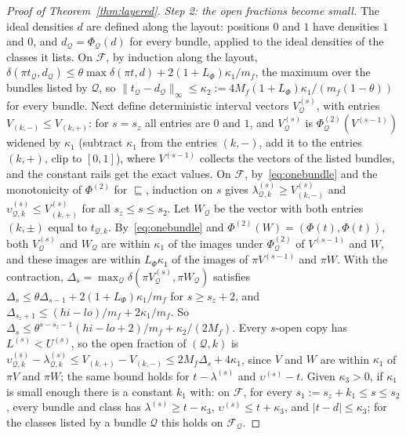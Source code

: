 \documentclass[11pt]{amsart}
\theoremstyle{definition}
\theoremstyle{remark}
\begin{document}
\begin{proof}[Proof of Theorem~\ref{thm:layered}]
\emph{Step 2: the open fractions become small.} The ideal densities $d$ are defined along the
layout: positions $0$ and $1$ have densities $1$ and $0$, and $d_{\mathcal Q}=\Phi_{\mathcal Q}(d)$
for every bundle, applied to the ideal densities of the classes it lists. On $\mathcal F$, by
induction along the layout, $\delta(\pi t_{\mathcal Q},d_{\mathcal Q})\le\theta\max\delta(\pi t,d)+2(1+L_\Phi)\kappa_1/m_f$,
the maximum over the bundles listed by $\mathcal Q$, so
$\|t_{\mathcal Q}-d_{\mathcal Q}\|_\infty\le\kappa_2:=4M_f(1+L_\Phi)\kappa_1/(m_f(1-\theta))$ for every
bundle. Next define deterministic interval vectors $V^{(s)}_{\mathcal Q}$, with entries
$V_{(k,-)}\le V_{(k,+)}$: for $s=s_z$ all entries are $0$ and $1$, and
$V^{(s)}_{\mathcal Q}$ is $\Phi^{(2)}_{\mathcal Q}(V^{(s-1)})$ widened by $\kappa_1$ (subtract $\kappa_1$
from the entries $(k,-)$, add it to the entries $(k,+)$, clip to $[0,1]$), where
$V^{(s-1)}$ collects the vectors of the listed bundles, and the constant rails get the exact
values. On $\mathcal F$, by~\eqref{eq:onebundle} and the monotonicity of $\Phi^{(2)}$ for
$\sqsubseteq$, induction on $s$ gives
$\lambda^{(s)}_{\mathcal Q,k}\ge V^{(s)}_{(k,-)}$ and $\upsilon^{(s)}_{\mathcal Q,k}\le V^{(s)}_{(k,+)}$
for all $s_z\le s\le s_2$. Let $W_{\mathcal Q}$ be the vector with both entries $(k,\pm)$ equal to
$t_{\mathcal Q,k}$. By~\eqref{eq:onebundle} and $\Phi^{(2)}(W)=(\Phi(t),\Phi(t))$, both
$V^{(s)}_{\mathcal Q}$ and $W_{\mathcal Q}$ are within $\kappa_1$ of the images under
$\Phi^{(2)}_{\mathcal Q}$ of $V^{(s-1)}$ and $W$, and these images are within $L_\Phi\kappa_1$ of the
images of $\pi V^{(s-1)}$ and $\pi W$. With the contraction, $\Delta_s=\max_{\mathcal Q}\delta(\pi V^{(s)}_{\mathcal Q},\pi W_{\mathcal Q})$
satisfies $\Delta_s\le\theta\Delta_{s-1}+2(1+L_\Phi)\kappa_1/m_f$ for $s\ge s_z+2$, and
$\Delta_{s_z+1}\le(hi-lo)/m_f+2\kappa_1/m_f$. So $\Delta_s\le\theta^{s-s_z-1}(hi-lo+2)/m_f+\kappa_2/(2M_f)$.
Every $s$-open copy has $L^{(s)}<U^{(s)}$, so the open fraction of $(\mathcal Q,k)$ is
$\upsilon^{(s)}_{\mathcal Q,k}-\lambda^{(s)}_{\mathcal Q,k}\le V_{(k,+)}-V_{(k,-)}\le2M_f\Delta_s+4\kappa_1$,
since $V$ and $W$ are within $\kappa_1$ of $\pi V$ and $\pi W$; the same bound holds for
$t-\lambda^{(s)}$ and $\upsilon^{(s)}-t$.
Given $\kappa_3>0$, if $\kappa_1$ is small enough there is a constant $k_1$ with: on $\mathcal F$,
for every $s_1:=s_z+k_1\le s\le s_2$, every bundle and class has
$\lambda^{(s)}\ge t-\kappa_3$, $\upsilon^{(s)}\le t+\kappa_3$, and $|t-d|\le\kappa_3$; for the classes
listed by a bundle $\mathcal Q$ this holds on $\mathcal F_{\mathcal Q}$.


\end{proof}
\end{document}
